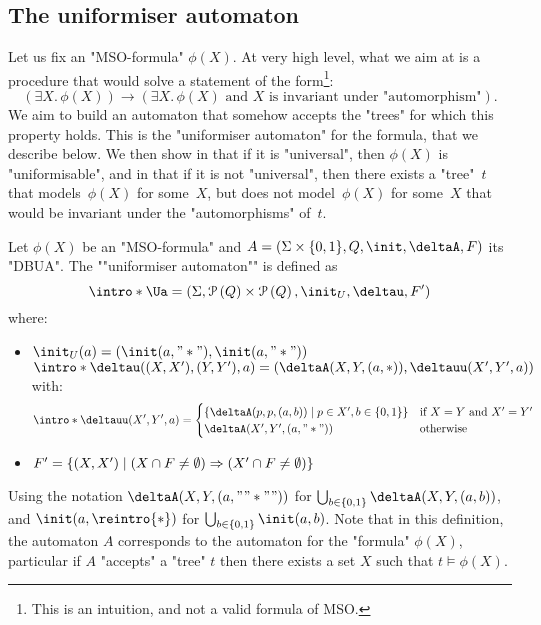 \documentclass[a4paper,UKenglish,cleveref, autoref, thm-restate]{lipics-v2021}
\begin{document}
\subsection{The uniformiser automaton}\label{section:uniformiser-automaton}
Let us fix an "MSO-formula" $\phi(X)$. At very high level, what we aim at is a procedure that would solve a statement of the form\footnote{This is an intuition, and not a valid formula of MSO.}:
\[
	(\exists X.\, \phi(X)) \rightarrow (\exists X.\, \phi(X) \text{ and $X$ is invariant under "automorphism"}).
\]
We aim to build an automaton that somehow accepts the "trees" for which this property holds.
This is the "uniformiser automaton" for the formula, that we describe below. We then show in  that if it is "universal",
then $\phi(X)$ is "uniformisable", and in  that if it is not "universal", then there exists a
"tree"~$t$ that models~$\phi(X)$ for some~$X$, but does not model~$\phi(X)$ for some~$X$ that would be invariant under the "automorphisms" of~$t$.
\begin{definition}
	\AP Let $\phi(X)$ be an "MSO-formula" and $A = (\Sigma \times \{0,1\}, Q, \init, \deltaA, F)$ its "DBUA". The ""uniformiser automaton"" is defined as
	\[
		\intro* \Ua = (\Sigma, \parts{Q} \times \parts{Q}, \init_U, \deltau, F')
	\]
	where:
	\begin{itemize}
		\item $\init_U(a) = (\init(a,"*"), \init(a,"*"))$
		      \itemAP $\intro*\deltau((X,X'),(Y,Y'),a) = (\deltaA(X,Y,(a,*)), \deltauu(X',Y',a))$ with:
		      \[
			      \intro*\deltauu(X',Y',a) = \begin{cases}
                      \setdef{\deltaA(p,p,(a,b))}{p \in X', b \in \set{0,1}} & \text{if } X = Y \text{ and } X' = Y'  \\
				      \deltaA(X',Y',(a,"*"))                                 & \text{otherwise}
			      \end{cases}
		      \]
		\item $F' = \left\{(X,X') \mid (X \cap F \neq \emptyset) \Rightarrow (X' \cap F \neq \emptyset)\right\}$
	\end{itemize}
	\AP Using the notation $\deltaA(X,Y,(a,""*""))$ for $\bigcup_{b \in \set{0,1}} \deltaA(X,Y,(a,b))$, and $\init(a,\reintro{*})$ for $\bigcup_{b \in \set{0,1}} \init(a,b)$.
	Note that in this definition, the automaton $A$ corresponds to the automaton for the "formula" $\phi(X)$, particular if $A$ "accepts" a "tree" $t$ then
	there exists a set $X$ such that $t \models \phi(X)$.
\end{definition}
\end{document}
